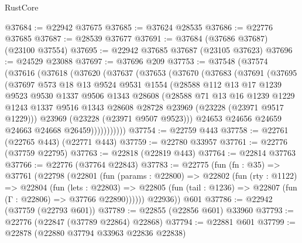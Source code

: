 \begin{lexlean}{RustCore}
\begin{coremodule}
@37684 := @22942 @37675
@37685 := @37624 @28535
@37686 := @22776 @37685
@37687 := @28539 @37677
@37691 := @37684 (@37686 @37687) (@23100 @37554)
@37695 := @22942 @37685 @37687 (@23105 @37623)
@37696 := @24529 @23088
@37697 := @37696 @209
@37753 := @37548
    (@37574
      (@37616
        (@37618
          (@37620
            (@37637
              (@37653
                (@37670
                  (@37683
                    (@37691
                      (@37695
                        (@37697
                          @573
                          @18
                          @13
                          @9524
                          @9531
                          @1554
                          (@28588
                            @112
                            @13
                            @17
                            @1239
                            @9523
                            @9530
                            @1337
                            @9506
                            @1343
                            @28608
                            (@28588
                              @71
                              @13
                              @16
                              @1239
                              @1229
                              @1243
                              @1337
                              @9516
                              @1343
                              @28608
                              @28728
                              @23969
                              (@23228 (@23971 @9517 @1229)))
                            @23969
                            (@23228 (@23971 @9507 @9523)))
                          @24653
                          @24656
                          @24659
                          @24663
                          @24668
                          @26459)))))))))))
@37754 := @22759 @443
@37758 := @22761 (@22765 @443) (@22771 @443)
@37759 := @22780 @33957
@37761 := @22776 (@37759 @22795)
@37763 := @22818 (@22819 @443)
@37764 := @22814 @37763
@37766 := @22776 (@37764 @22843)
@37783 := @22775
    (fun (fn : @35) =>
    @37761
      (@22798
        (@22801
          (fun (params : @22800) =>
          @22802
            (fun (rty : @1122) =>
            @22804
              (fun (lets : @22803) =>
              @22805 (fun (tail : @1236) => @22807 (fun (Γ : @22806) => @37766 @22890))))))
        @22936))
    @601
@37786 := @22942 (@37759 (@22793 @601))
@37789 := @22855 (@22856 @601) @33960
@37793 := @22776 (@22847 (@37789 @22864) @22868)
@37794 := @22881 @601
@37799 := @22878 (@22880 @37794 @33963 @22836 @22838)

\end{coremodule}
\end{lexlean}
